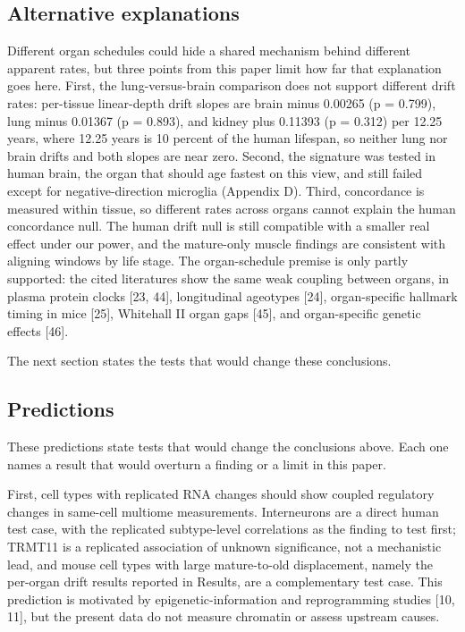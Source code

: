 \documentclass[11pt]{article}
\begin{document}
\subsection*{Alternative explanations}

Different organ schedules could hide a shared mechanism behind different apparent rates, but three points from this paper limit how far that explanation goes here. First, the lung-versus-brain comparison does not support different drift rates: per-tissue linear-depth drift slopes are brain minus 0.00265 (p = 0.799), lung minus 0.01367 (p = 0.893), and kidney plus 0.11393 (p = 0.312) per 12.25 years, where 12.25 years is 10 percent of the human lifespan, so neither lung nor brain drifts and both slopes are near zero. Second, the signature was tested in human brain, the organ that should age fastest on this view, and still failed except for negative-direction microglia (Appendix D). Third, concordance is measured within tissue, so different rates across organs cannot explain the human concordance null. The human drift null is still compatible with a smaller real effect under our power, and the mature-only muscle findings are consistent with aligning windows by life stage. The organ-schedule premise is only partly supported: the cited literatures show the same weak coupling between organs, in plasma protein clocks [23, 44], longitudinal ageotypes [24], organ-specific hallmark timing in mice [25], Whitehall II organ gaps [45], and organ-specific genetic effects [46].

The next section states the tests that would change these conclusions.
\subsection*{Predictions}

These predictions state tests that would change the conclusions above. Each one names a result that would overturn a finding or a limit in this paper.

First, cell types with replicated RNA changes should show coupled regulatory changes in same-cell multiome measurements. Interneurons are a direct human test case, with the replicated subtype-level correlations as the finding to test first; TRMT11 is a replicated association of unknown significance, not a mechanistic lead, and mouse cell types with large mature-to-old displacement, namely the per-organ drift results reported in Results, are a complementary test case. This prediction is motivated by epigenetic-information and reprogramming studies [10, 11], but the present data do not measure chromatin or assess upstream causes.
\end{document}
